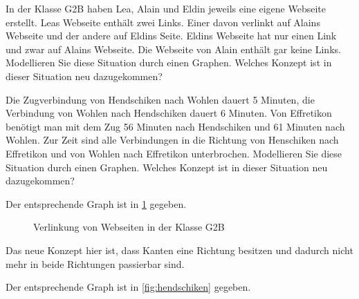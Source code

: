 \begin{myexercise}\label{aufgabe:02}
\begin{aenum}
    \item In der Klasse G2B haben Lea, Alain und Eldin jeweils eine eigene Webseite erstellt. Leas Webseite enthält zwei Links. Einer davon verlinkt auf Alains Webseite und der andere auf Eldins Seite. Eldins Webseite hat nur einen Link und zwar auf Alains Webseite. Die Webseite von Alain enthält gar keine Links. Modellieren Sie diese Situation durch einen Graphen. Welches Konzept ist in dieser Situation neu dazugekommen?
    \item Die Zugverbindung von Hendschiken nach Wohlen dauert 5 Minuten, die Verbindung von Wohlen nach Hendschiken dauert 6 Minuten. Von Effretikon benötigt man mit dem Zug 56 Minuten nach Hendschiken und 61 Minuten nach Wohlen. Zur Zeit sind alle Verbindungen in die Richtung von Henschiken nach Effretikon und von Wohlen nach Effretikon unterbrochen. Modellieren Sie diese Situation durch einen Graphen. Welches Konzept ist in dieser Situation neu dazugekommen?
\end{aenum}
\begin{myanswer}\label{aufgabe:02-sol}
\begin{aenum}
\item Der entsprechende Graph ist in \cref{fig:webseiten} gegeben.
\begin{figure}[H]
\centering
{}
    \caption{Verlinkung von Webseiten in der Klasse G2B}
    \label{fig:webseiten}
\end{figure}
\noindent
Das neue Konzept hier ist, dass Kanten eine Richtung besitzen und dadurch nicht mehr in beide Richtungen passierbar sind.
\item Der entsprechende Graph ist in \cref{fig:hendschiken} gegeben.
\begin{figure}[H]

\end{figure}
\end{aenum}
\end{myanswer}
\end{myexercise}
